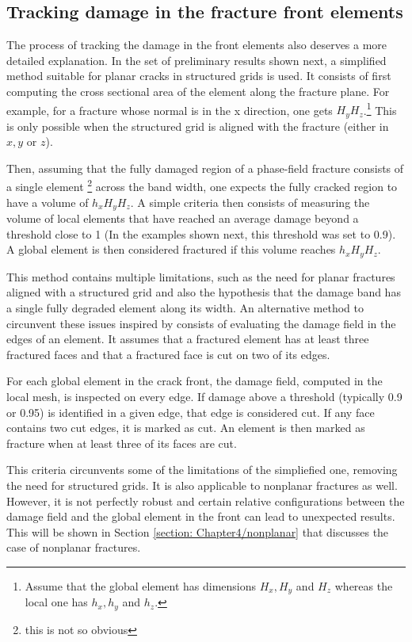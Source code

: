 \FloatBarrier

\subsection{Tracking damage in the fracture front elements}\label{frontTrackingAlgo}

The process of tracking the damage in the front elements also deserves a more detailed explanation. In the set of preliminary results shown next, a simplified method suitable for planar cracks in structured grids is used. It consists of first computing the cross sectional area of the element along the fracture plane. For example, for a fracture whose normal is in the x direction, one gets $H_yH_z$.\footnote{Assume that the global element has dimensions $H_x, H_y$ and $H_z$ whereas the local one has $h_x, h_y$ and $h_z$.} This is only possible when the structured grid is aligned with the fracture (either in $x, y$ or $z$).

Then, assuming that the fully damaged region of a phase-field fracture consists of a single element \footnote{this is not so obvious} across the band width, one expects the fully cracked region to have a volume of $h_xH_yH_z$. A simple criteria then consists of measuring the volume of local elements that have reached an average damage beyond a threshold close to 1 (In the examples shown next, this threshold was set to 0.9). A global element is then considered fractured if this volume reaches $h_xH_yH_z$.

This method contains multiple limitations, such as the need for planar fractures aligned with a structured grid and also the hypothesis that the damage band has a single fully degraded element along its width. An alternative method to circunvent these issues inspired by \cite{muixi2021combined} consists of evaluating the damage field in the edges of an element. It assumes that a fractured element has at least three fractured faces and that a fractured face is cut on two of its edges.

For each global element in the crack front, the damage field, computed in the local mesh, is inspected on every edge. If damage above a threshold (typically 0.9 or 0.95) is identified in a given edge, that edge is considered cut. If any face contains two cut edges, it is marked as cut. An element is then marked as fracture when at least three of its faces are cut.

This criteria circunvents some of the limitations of the simpliefied one, removing the need for structured grids. It is also applicable to nonplanar fractures as well. However, it is not perfectly robust and certain relative configurations between the damage field and the global element in the front can lead to unexpected results. This will be shown in Section \ref{section: Chapter4/nonplanar} that discusses the case of nonplanar fractures.


